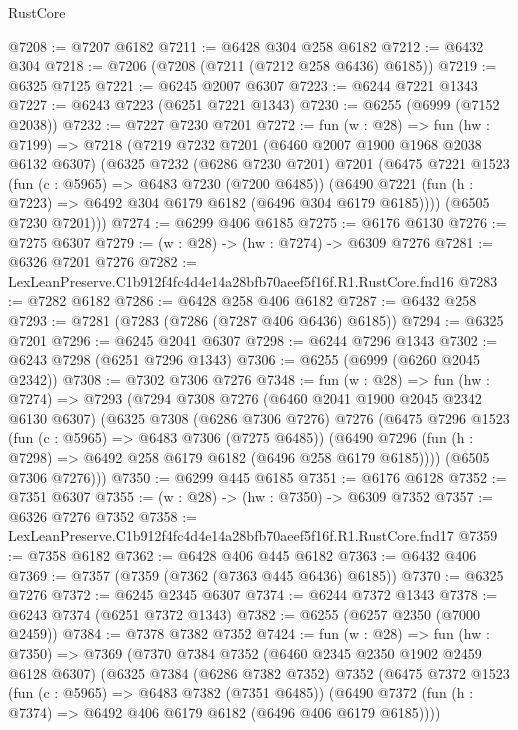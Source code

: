 \begin{lexlean}{RustCore}
\begin{coremodule}
@7208 := @7207 @6182
@7211 := @6428 @304 @258 @6182
@7212 := @6432 @304
@7218 := @7206 (@7208 (@7211 (@7212 @258 @6436) @6185))
@7219 := @6325 @7125
@7221 := @6245 @2007 @6307
@7223 := @6244 @7221 @1343
@7227 := @6243 @7223 (@6251 @7221 @1343)
@7230 := @6255 (@6999 (@7152 @2038))
@7232 := @7227 @7230 @7201
@7272 := fun (w : @28) =>
  fun (hw : @7199) =>
  @7218
    (@7219
      @7232
      @7201
      (@6460 @2007 @1900 @1968 @2038 @6132 @6307)
      (@6325
        @7232
        (@6286 @7230 @7201)
        @7201
        (@6475
          @7221
          @1523
          (fun (c : @5965) => @6483 @7230 (@7200 @6485))
          (@6490 @7221 (fun (h : @7223) => @6492 @304 @6179 @6182 (@6496 @304 @6179 @6185))))
        (@6505 @7230 @7201)))
@7274 := @6299 @406 @6185
@7275 := @6176 @6130
@7276 := @7275 @6307
@7279 := (w : @28) -> (hw : @7274) -> @6309 @7276
@7281 := @6326 @7201 @7276
@7282 := LexLeanPreserve.C1b912f4fc4d4e14a28bfb70aeef5f16f.R1.RustCore.fnd16
@7283 := @7282 @6182
@7286 := @6428 @258 @406 @6182
@7287 := @6432 @258
@7293 := @7281 (@7283 (@7286 (@7287 @406 @6436) @6185))
@7294 := @6325 @7201
@7296 := @6245 @2041 @6307
@7298 := @6244 @7296 @1343
@7302 := @6243 @7298 (@6251 @7296 @1343)
@7306 := @6255 (@6999 (@6260 @2045 @2342))
@7308 := @7302 @7306 @7276
@7348 := fun (w : @28) =>
  fun (hw : @7274) =>
  @7293
    (@7294
      @7308
      @7276
      (@6460 @2041 @1900 @2045 @2342 @6130 @6307)
      (@6325
        @7308
        (@6286 @7306 @7276)
        @7276
        (@6475
          @7296
          @1523
          (fun (c : @5965) => @6483 @7306 (@7275 @6485))
          (@6490 @7296 (fun (h : @7298) => @6492 @258 @6179 @6182 (@6496 @258 @6179 @6185))))
        (@6505 @7306 @7276)))
@7350 := @6299 @445 @6185
@7351 := @6176 @6128
@7352 := @7351 @6307
@7355 := (w : @28) -> (hw : @7350) -> @6309 @7352
@7357 := @6326 @7276 @7352
@7358 := LexLeanPreserve.C1b912f4fc4d4e14a28bfb70aeef5f16f.R1.RustCore.fnd17
@7359 := @7358 @6182
@7362 := @6428 @406 @445 @6182
@7363 := @6432 @406
@7369 := @7357 (@7359 (@7362 (@7363 @445 @6436) @6185))
@7370 := @6325 @7276
@7372 := @6245 @2345 @6307
@7374 := @6244 @7372 @1343
@7378 := @6243 @7374 (@6251 @7372 @1343)
@7382 := @6255 (@6257 @2350 (@7000 @2459))
@7384 := @7378 @7382 @7352
@7424 := fun (w : @28) =>
  fun (hw : @7350) =>
  @7369
    (@7370
      @7384
      @7352
      (@6460 @2345 @2350 @1902 @2459 @6128 @6307)
      (@6325
        @7384
        (@6286 @7382 @7352)
        @7352
        (@6475
          @7372
          @1523
          (fun (c : @5965) => @6483 @7382 (@7351 @6485))
          (@6490 @7372 (fun (h : @7374) => @6492 @406 @6179 @6182 (@6496 @406 @6179 @6185))))

\end{coremodule}
\end{lexlean}
